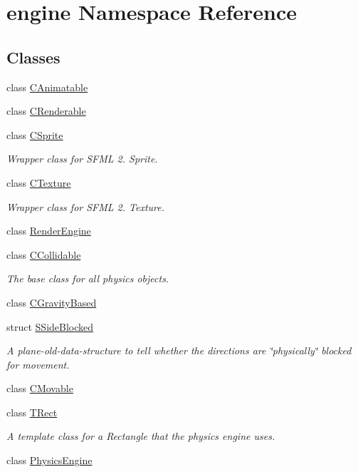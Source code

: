 \hypertarget{namespaceengine}{\section{engine Namespace Reference}
\label{namespaceengine}
}
\subsection*{Classes}
\begin{DoxyCompactItemize}
\item 
class \hyperlink{classengine_1_1CAnimatable}{C\-Animatable}
\item 
class \hyperlink{classengine_1_1CRenderable}{C\-Renderable}
\item 
class \hyperlink{classengine_1_1CSprite}{C\-Sprite}
\begin{DoxyCompactList}\small\item\em Wrapper class for S\-F\-M\-L 2. Sprite. \end{DoxyCompactList}\item 
class \hyperlink{classengine_1_1CTexture}{C\-Texture}
\begin{DoxyCompactList}\small\item\em Wrapper class for S\-F\-M\-L 2. Texture. \end{DoxyCompactList}\item 
class \hyperlink{classengine_1_1RenderEngine}{Render\-Engine}
\item 
class \hyperlink{classengine_1_1CCollidable}{C\-Collidable}
\begin{DoxyCompactList}\small\item\em The base class for all physics objects. \end{DoxyCompactList}\item 
class \hyperlink{classengine_1_1CGravityBased}{C\-Gravity\-Based}
\item 
struct \hyperlink{structengine_1_1SSideBlocked}{S\-Side\-Blocked}
\begin{DoxyCompactList}\small\item\em A plane-\/old-\/data-\/structure to tell whether the directions are \char`\"{}physically\char`\"{} blocked for movement. \end{DoxyCompactList}\item 
class \hyperlink{classengine_1_1CMovable}{C\-Movable}
\item 
class \hyperlink{classengine_1_1TRect}{T\-Rect}
\begin{DoxyCompactList}\small\item\em A template class for a Rectangle that the physics engine uses. \end{DoxyCompactList}\item 
class \hyperlink{classengine_1_1PhysicsEngine}{Physics\-Engine}
\end{DoxyCompactItemize}
